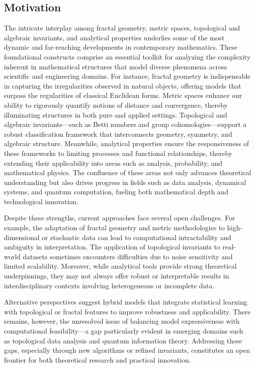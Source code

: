 \documentclass[sigconf]{acmart}
\begin{document}
\maketitle

\subsection{Motivation}

The intricate interplay among fractal geometry, metric spaces, topological and algebraic invariants, and analytical properties underlies some of the most dynamic and far-reaching developments in contemporary mathematics. These foundational constructs comprise an essential toolkit for analyzing the complexity inherent in mathematical structures that model diverse phenomena across scientific and engineering domains. For instance, fractal geometry is indispensable in capturing the irregularities observed in natural objects, offering models that surpass the regularities of classical Euclidean forms. Metric spaces enhance our ability to rigorously quantify notions of distance and convergence, thereby illuminating structures in both pure and applied settings. Topological and algebraic invariants—such as Betti numbers and group cohomologies—support a robust classification framework that interconnects geometry, symmetry, and algebraic structure. Meanwhile, analytical properties ensure the responsiveness of these frameworks to limiting processes and functional relationships, thereby extending their applicability into areas such as analysis, probability, and mathematical physics. The confluence of these areas not only advances theoretical understanding but also drives progress in fields such as data analysis, dynamical systems, and quantum computation, fueling both mathematical depth and technological innovation. 

Despite these strengths, current approaches face several open challenges. For example, the adaptation of fractal geometry and metric methodologies to high-dimensional or stochastic data can lead to computational intractability and ambiguity in interpretation. The application of topological invariants to real-world datasets sometimes encounters difficulties due to noise sensitivity and limited scalability. Moreover, while analytical tools provide strong theoretical underpinnings, they may not always offer robust or interpretable results in interdisciplinary contexts involving heterogeneous or incomplete data.

Alternative perspectives suggest hybrid models that integrate statistical learning with topological or fractal features to improve robustness and applicability. There remains, however, the unresolved issue of balancing model expressiveness with computational feasibility---a gap particularly evident in emerging domains such as topological data analysis and quantum information theory. Addressing these gaps, especially through new algorithms or refined invariants, constitutes an open frontier for both theoretical research and practical innovation.
\end{document}
